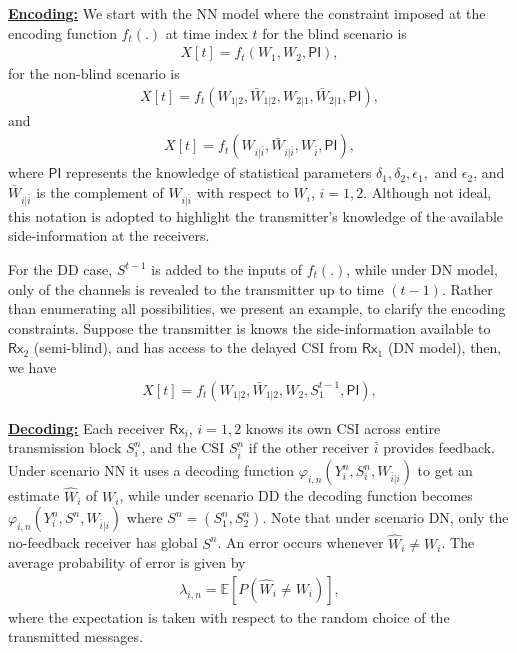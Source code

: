 \documentclass[journal,12pt,draftcls,onecolumn]{IEEEtran}
\newcommand{\msf}{\mathsf}
\newcommand{\lp}{\left(}
\newcommand{\rp}{\right)}
\begin{document}
\noindent \underline{\bf Encoding:} We start with the NN model where the constraint imposed at the encoding function $f_t(.)$ at time index $t$ for the blind scenario is
\begin{align}
\label{eq_enc_function_blind}
X[t] = f_t\lp W_1, W_2, \msf{PI} \rp,
\end{align}
for the non-blind scenario is
\begin{align}
\label{eq_enc_function_nonblind}
X[t] = f_t\lp W_{1|2}, \bar{W}_{1|2}, W_{2|1}, \bar{W}_{2|1}, \msf{PI} \rp,
\end{align}
and
\begin{align}
\label{eq_enc_function_semiblind}
X[t] = f_t\lp W_{i|\bar{i}}, \bar{W}_{i|\bar{i}}, W_{\bar{i}}, \msf{PI} \rp,
\end{align}
where $\msf{PI}$ represents the knowledge of statistical parameters $\delta_1, \delta_2, \epsilon_1,$ and $\epsilon_2$, and $\bar{W}_{i|\bar{i}}$ is the complement of $W_{i|\bar{i}}$ with respect to $W_i$, $i=1,2$. Although not ideal, this notation is adopted to highlight the transmitter's knowledge of the available side-information at the receivers.

For the DD case, $S^{t-1}$ is added to the inputs of $f_t(.)$, while under DN model, only of the channels is revealed to the transmitter up to time $(t-1)$. Rather than enumerating all possibilities, we present an example, to clarify the encoding constraints. Suppose the transmitter is knows the side-information available to $\msf{Rx}_2$ (semi-blind), and has access to the delayed CSI from $\msf{Rx}_1$ (DN model), then, we have
\begin{align}
\label{eq_enc_function_example}
X[t] = f_t\lp W_{1|2}, \bar{W}_{1|2}, W_2, S_1^{t-1}, \msf{PI} \rp,
\end{align}

\noindent \underline{\bf Decoding:} Each receiver $\msf{Rx}_i$, $i=1,2$ knows its own CSI across entire transmission block $S^n_i$, and the CSI $S^n_{\bar{i}}$ if the other receiver $\bar{i}$ provides feedback. Under scenario NN it uses a decoding function $\varphi_{i,n}\left( Y_i^n, S_i^n, W_{\bar{i}|i} \right)$ to get an estimate $\widehat{W}_i$ of $W_i$, while under scenario DD the decoding function becomes $\varphi_{i,n}\left( Y_i^n, S^n, W_{\bar{i}|i} \right)$ where $S^n=(S_1^n, S^n_2)$. Note that under scenario DN, only the no-feedback receiver has global $S^n$. An error occurs whenever $\widehat{W}_i \neq W_i$. The average probability of error is given by
\begin{align}
\lambda_{i,n} = \mathbb{E}[P(\widehat{W}_i \neq W_i)],
\end{align}
where the expectation is taken with respect to the random choice of the transmitted messages.
\end{document}
